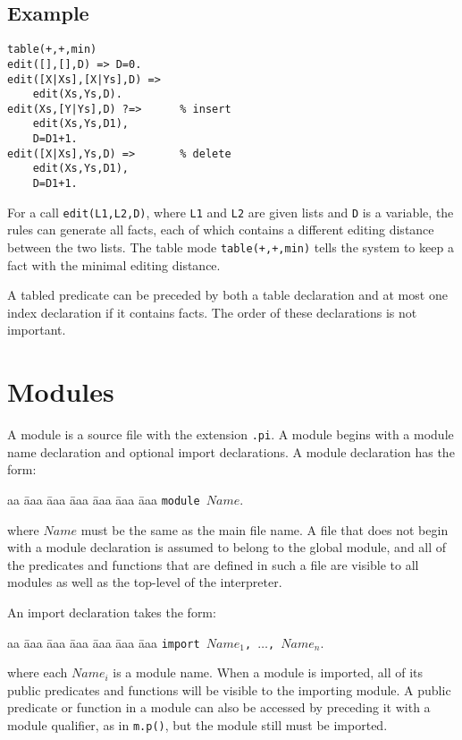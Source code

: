 \subsection*{Example}
\begin{verbatim}
table(+,+,min)
edit([],[],D) => D=0.
edit([X|Xs],[X|Ys],D) =>   
    edit(Xs,Ys,D).
edit(Xs,[Y|Ys],D) ?=>      % insert
    edit(Xs,Ys,D1),
    D=D1+1.
edit([X|Xs],Ys,D) =>       % delete
    edit(Xs,Ys,D1),
    D=D1+1.
\end{verbatim}
For a call \texttt{edit(L1,L2,D)}, where \texttt{L1} and \texttt{L2} are given lists and \texttt{D} is a variable, the rules can generate all facts, each of which contains a different editing distance between the two lists. The table mode \texttt{table(+,+,min)} tells the system to keep a fact with the minimal editing distance. 

A tabled predicate can be preceded by both a table declaration and at most one index declaration if it contains facts. The order of these declarations is not important.

\section{Modules}
A module is a source file with the extension \texttt{.pi}. A module begins with a module name declaration and optional import declarations. A module declaration has the form: 
\begin{tabbing}
aa \= aaa \= aaa \= aaa \= aaa \= aaa \= aaa \kill
\> \texttt{module $Name$}.
\end{tabbing}
where $Name$ must be the same as the main file name. A file that does not begin with a module declaration is assumed to belong to the global module, and all of the predicates and functions that are defined in such a file are visible to all modules as well as the top-level of the interpreter. 

An import declaration takes the form: 
\begin{tabbing}
aa \= aaa \= aaa \= aaa \= aaa \= aaa \= aaa \kill
\> \texttt{import $Name_1$, $\ldots$, $Name_n$}.
\end{tabbing}
where each $Name_i$ is a module name. When a module is imported, all of its public predicates and functions will be visible to the importing module. A public predicate or function in a module can also be accessed by preceding it with a module qualifier, as in \texttt{m.p()}, but the module still must be imported.

